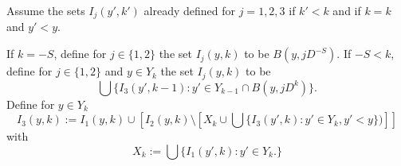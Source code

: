 Assume the sets ${I}_j(y',k')$ already defined  for $j=1,2,3$ if $k'<k$ and if  $k=k$ and $y'<y$.




If $k=-S$, define for  $j\in \{1,2\}$ the set
${I}_j(y,k)$ to be $B(y,jD^{-S})$.
If $-S<k$, define for $j\in \{1,2\}$
and $y\in Y_k$ the set ${I}_j(y,k)$ to be
\begin{equation}\label{defineij}
\bigcup\{I_3(y',k-1):
y'\in Y_{k-1}\cap  B(y,jD^k)\}.
\end{equation}
Define for $y\in Y_k$
\begin{equation}\label{definei3}
I_3(y,k):={I_1}(y,k)\cup \left[{I_2}(y,k)\setminus \left[X_k\cup \bigcup\{I_3(y',k):y'\in Y_{k}, y'<y\})\right]\right]
\end{equation}
with
\begin{equation}
      X_{k}:=\bigcup\{I_1(y', k):y'\in Y_{k} .\}
\end{equation}


